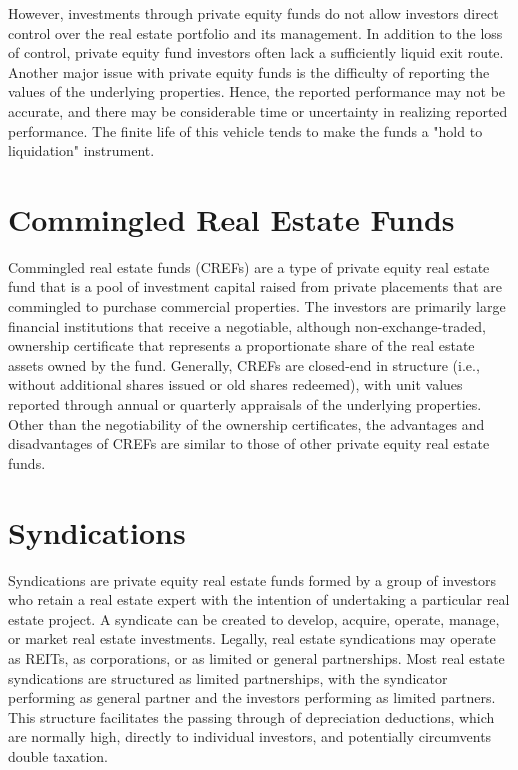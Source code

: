 \documentclass[11pt]{article}
\begin{document}
However, investments through private equity funds do not allow investors direct control over the real estate portfolio and its management. In addition to the loss of control, private equity fund investors often lack a sufficiently liquid exit route. Another major issue with private equity funds is the difficulty of reporting the values of the underlying properties. Hence, the reported performance may not be accurate, and there may be considerable time or uncertainty in realizing reported performance. The finite life of this vehicle tends to make the funds a "hold to liquidation" instrument.

\section*{Commingled Real Estate Funds}
Commingled real estate funds (CREFs) are a type of private equity real estate fund that is a pool of investment capital raised from private placements that are commingled to purchase commercial properties. The investors are primarily large financial institutions that receive a negotiable, although non-exchange-traded, ownership certificate that represents a proportionate share of the real estate assets owned by the fund. Generally, CREFs are closed-end in structure (i.e., without additional shares issued or old shares redeemed), with unit values reported through annual or quarterly appraisals of the underlying properties. Other than the negotiability of the ownership certificates, the advantages and disadvantages of CREFs are similar to those of other private equity real estate funds.

\section*{Syndications}
Syndications are private equity real estate funds formed by a group of investors who retain a real estate expert with the intention of undertaking a particular real estate project. A syndicate can be created to develop, acquire, operate, manage, or market real estate investments. Legally, real estate syndications may operate as REITs, as corporations, or as limited or general partnerships. Most real estate syndications are structured as limited partnerships, with the syndicator performing as general partner and the investors performing as limited partners. This structure facilitates the passing through of depreciation deductions, which are normally high, directly to individual investors, and potentially circumvents double taxation.
\end{document}
